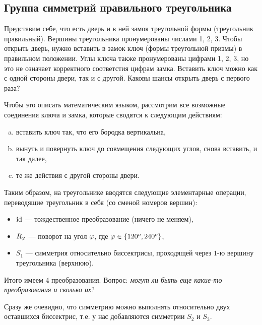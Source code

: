\subsection{Группа симметрий правильного треугольника}

Представим себе, что есть дверь и в ней замок треугольной формы (треугольник правильный). Вершины треугольника пронумерованы числами 1, 2, 3. Чтобы открыть дверь, нужно вставить в замок ключ (формы треугольной призмы) в правильном положении.
Углы ключа также пронумерованы цифрами 1, 2, 3, но это не означает корректного соответстия цифрам замка.
Вставить ключ можно как с одной стороны двери, так и с другой. Каковы шансы открыть дверь с первого раза?

Чтобы это описать математическим языком, рассмотрим все возможные соединения ключа и замка, которые сводятся к следующим действиям:
\begin{enumerate}[a)]
\item вставить ключ так, что его бородка вертикальна,
\item вынуть и повернуть ключ до совмещения следующих углов, снова вставить, и так далее,
\item те же действия с другой стороны двери.
\end{enumerate}

Таким образом, на треугольнике вводятся следующие элементарные операции, переводящие треугольник в себя (со сменой номеров вершин):
\begin{itemize}
\item $\mathrm{id}$ --- тождественное преобразование (ничего не меняем),
\item $R_\varphi$ --- поворот на угол $\varphi$, где $\varphi\in\{120^o,240^o\}$,
\item $S_1$ --- симметрия относительно биссектрисы, проходящей через $1$-ю вершину треугольника (верхнюю).
\end{itemize}

Итого имеем 4 преобразования. Вопрос: \textit{могут ли быть еще какие-то преобразования и сколько их}?

Сразу же очевидно, что симметрию можно выполнять относительно двух оставшихся биссектрис, т.е. у нас добавляются симметрии $S_2$ и $S_3$.

